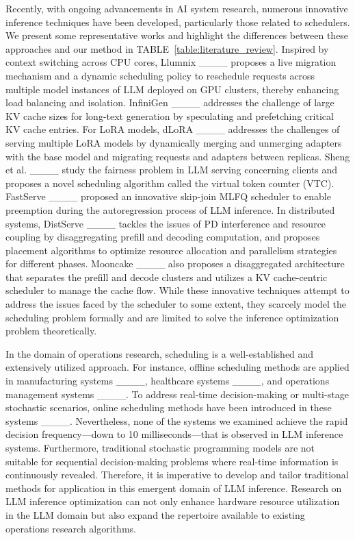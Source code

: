 Recently, with ongoing advancements in AI system research, numerous innovative inference techniques have been developed, particularly those related to schedulers. We present some representative works and highlight the differences between these approaches and our method in TABLE~\ref{table:literature_review}. Inspired by context switching across CPU cores, Llumnix ____ proposes a live migration mechanism and a dynamic scheduling policy to reschedule requests across multiple model instances of LLM deployed on GPU clusters, thereby enhancing load balancing and isolation. InfiniGen ____ addresses the challenge of large KV cache sizes for long-text generation by speculating and prefetching critical KV cache entries. For LoRA models, dLoRA ____ addresses the challenges of serving multiple LoRA models by dynamically merging and unmerging adapters with the base model and migrating requests and adapters between replicas. Sheng et al. ____ study the fairness problem in LLM serving concerning clients and proposes a novel scheduling algorithm called the virtual token counter (VTC). FastServe ____ proposed an innovative skip-join MLFQ scheduler to enable preemption during the autoregression process of LLM inference. In distributed systems, DistServe ____ tackles the issues of PD interference and resource coupling by disaggregating prefill and decoding computation, and proposes placement algorithms to optimize resource allocation and parallelism strategies for different phases. Mooncake ____ also proposes a disaggregated architecture that separates the prefill and decode clusters and utilizes a KV cache-centric scheduler to manage the cache flow. While these innovative techniques attempt to address the issues faced by the scheduler to some extent, they scarcely model the scheduling problem formally and are limited to solve the inference optimization problem theoretically.


In the domain of operations research, scheduling is a well-established and extensively utilized approach. For instance, offline scheduling methods are applied in manufacturing systems ____, healthcare systems ____, and operations management systems ____. To address real-time decision-making or multi-stage stochastic scenarios, online scheduling methods have been introduced in these systems ____. Nevertheless, none of the systems we examined achieve the rapid decision frequency—down to 10 milliseconds—that is observed in LLM inference systems. Furthermore, traditional stochastic programming models are not suitable for sequential decision-making problems where real-time information is continuously revealed. Therefore, it is imperative to develop and tailor traditional methods for application in this emergent domain of LLM inference. Research on LLM inference optimization can not only enhance hardware resource utilization in the LLM domain but also expand the repertoire available to existing operations research algorithms.


